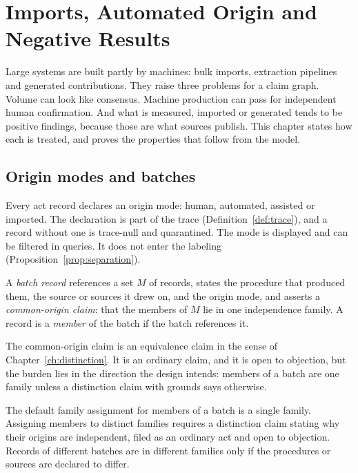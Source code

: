 \chapter{Imports, Automated Origin and Negative Results}\label{ch:imports}

Large systems are built partly by machines: bulk imports, extraction pipelines and generated contributions. They raise three problems for a claim graph. Volume can look like consensus. Machine production can pass for independent human confirmation. And what is measured, imported or generated tends to be positive findings, because those are what sources publish. This chapter states how each is treated, and proves the properties that follow from the model.

\section{Origin modes and batches}\label{sec:origin}

Every act record declares an origin mode: \textsf{human}, \textsf{automated}, \textsf{assisted} or \textsf{imported}. The declaration is part of the trace (Definition~\ref{def:trace}), and a record without one is trace-null and quarantined. The mode is displayed and can be filtered in queries. It does not enter the labeling (Proposition~\ref{prop:separation}).

\begin{definition}[Batch]\label{def:batch}
A \emph{batch record} references a set $M$ of records, states the procedure that produced them, the source or sources it drew on, and the origin mode, and asserts a \emph{common-origin claim}: that the members of $M$ lie in one independence family. A record is a \emph{member} of the batch if the batch references it.
\end{definition}

The common-origin claim is an equivalence claim in the sense of Chapter~\ref{ch:distinction}. It is an ordinary claim, and it is open to objection, but the burden lies in the direction the design intends: members of a batch are one family unless a distinction claim with grounds says otherwise.

\begin{designrule}\label{rule:batchfamily}
The default family assignment for members of a batch is a single family. Assigning members to distinct families requires a distinction claim stating why their origins are independent, filed as an ordinary act and open to objection. Records of different batches are in different families only if the procedures or sources are declared to differ.
\end{designrule}

